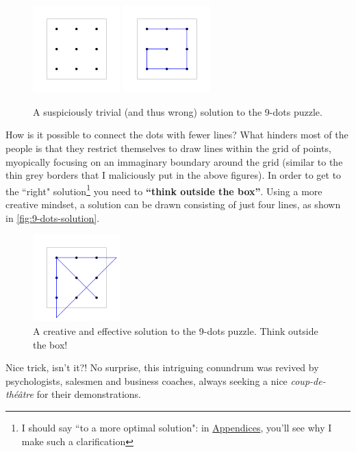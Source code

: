 \documentclass[11pt]{article}
\begin{document}
\begin{figure}[H]
\centering
\includegraphics[width=0.3\textwidth]{images/9-dots-grid.png}
\includegraphics[width=0.3\textwidth]{images/9-dots-wrong-solution.png}
\caption{A suspiciously trivial (and thus wrong) solution to the 9-dots puzzle.}
\label{fig:9-dots-wrong}
\end{figure}
How is it possible to connect the dots with fewer lines?
What hinders most of the people is that they restrict themselves to draw lines within the grid of points, myopically focusing on an immaginary boundary around the grid (similar to the thin grey borders that I maliciously put in the above figures). In order to get to the ``right" solution\footnote{I should say ``to a more optimal solution": in \hyperlink{appendices}{Appendices}, you'll see why I make such a clarification} you need to \textbf{``think outside the box''}. Using a more creative mindset, a solution can be drawn consisting of just four lines, as shown in \autoref{fig:9-dots-solution}.
\begin{figure}[H]
\centering
\includegraphics[width=0.3\textwidth]{images/9-dots-solution.png}
\caption{A creative and effective solution to the 9-dots puzzle. Think outside the box!}
\label{fig:9-dots-solution}
\end{figure}
Nice trick, isn't it?! No surprise, this intriguing conundrum was revived by psychologists, salesmen and business coaches, always seeking a nice \emph{coup-de-théâtre} for their demonstrations.
\end{document}
